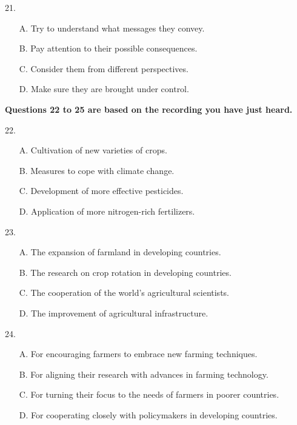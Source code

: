\documentclass[UTF8,11pt]{ctexart}
\begin{document}
21.


\begin{itemize}[leftmargin=2em,itemsep=.2em,topsep=.4em]\item[A.] Try to understand what messages they convey.
\item[B.] Pay attention to their possible consequences.
\item[C.] Consider them from different perspectives.
\item[D.] Make sure they are brought under control.
\end{itemize}

\textbf{Questions 22 to 25 are based on the recording you have just heard.}


22.


\begin{itemize}[leftmargin=2em,itemsep=.2em,topsep=.4em]\item[A.] Cultivation of new varieties of crops.
\item[B.] Measures to cope with climate change.
\item[C.] Development of more effective pesticides.
\item[D.] Application of more nitrogen-rich fertilizers.
\end{itemize}

23.


\begin{itemize}[leftmargin=2em,itemsep=.2em,topsep=.4em]\item[A.] The expansion of farmland in developing countries.
\item[B.] The research on crop rotation in developing countries.
\item[C.] The cooperation of the world's agricultural scientists.
\item[D.] The improvement of agricultural infrastructure.
\end{itemize}

24.


\begin{itemize}[leftmargin=2em,itemsep=.2em,topsep=.4em]\item[A.] For encouraging farmers to embrace new farming techniques.
\item[B.] For aligning their research with advances in farming technology.
\item[C.] For turning their focus to the needs of farmers in poorer countries.
\item[D.] For cooperating closely with policymakers in developing countries.
\end{itemize}
\end{document}
